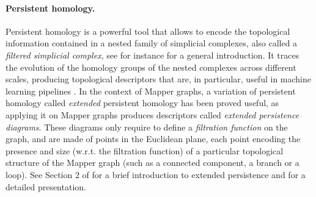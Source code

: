 \paragraph*{Persistent homology.}
Persistent homology is a powerful tool that allows to encode the topological information contained in a nested family of simplicial complexes, also called a \emph{filtered simplicial complex}, see for instance \cite{edelsbrunner2022computational} for a general introduction. It traces the evolution of the homology groups of the nested complexes across different scales, producing topological descriptors that are, in particular, useful in machine learning pipelines \cite{chazal2021introduction}.
In the context of Mapper graphs, a variation of persistent homology called {\em extended} persistent homology has been proved useful, as applying it on Mapper graphs produces descriptors called {\em extended persistence diagrams}. These diagrams only require to define a {\em filtration function} on the graph, and are made of points in the Euclidean plane, each point encoding the presence and size (w.r.t. the filtration function) of a particular topological structure of the Mapper graph (such as a connected component, a branch or a loop).
See Section 2 of \cite{carriere2020perslay} for a brief introduction to extended persistence and \cite{cohen2009extending} for a detailed presentation. 

